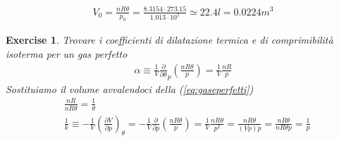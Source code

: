 \documentclass[10pt,a4paper]{article}
\newtheorem{exercise}{Exercise}
\begin{document}
\begin{align*} 
V_0 = \frac{n R \theta}{p_0} = \frac{8.3154\cdot 273.15}{1.013\cdot 10^{5}}\simeq 22.4 l = 0.0224 m^3
\end{align*} 
\begin{exercise}
Trovare i coefficienti di dilatazione termica e di comprimibilità isoterma per un gas perfetto
\begin{align*} 
	\alpha \equiv \frac{1}{V}\frac{\partial}{\partial\theta}_p(\frac{n R \theta}{p}) = \frac{1}{V}\frac{n R}{p}
\end{align*} 
Sostituiamo il volume avvalendoci della (\ref{eq:gaseperfetti})
\begin{align*} 
	&\frac{n R}{n R \theta} = \frac{1}{\theta}\\
	&\frac{1}{k} \equiv -\frac{1}{V}(\frac{\partial V}{\partial p})_{\theta} = -\frac{1}{V}\frac{\partial}{\partial p}(\frac{n R \theta}{p})= \frac{1}{V}\frac{n R \theta}{p^2} = \frac{n R \theta}{(Vp) p} = \frac{n R \theta}{n R \theta p} = \frac{1}{p}
\end{align*} 
\end{exercise} 
\end{document}
